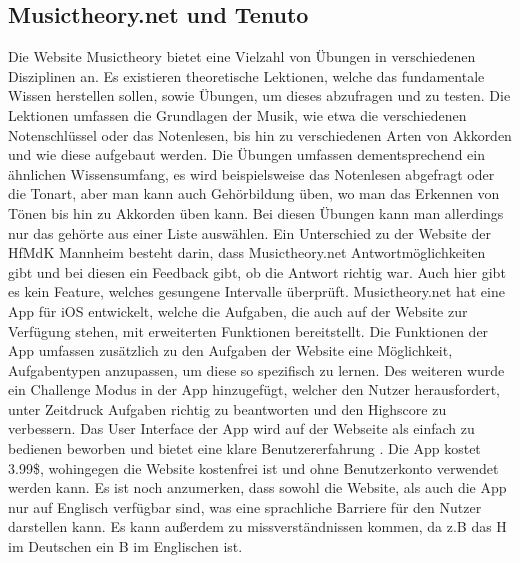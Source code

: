 \subsection*{Musictheory.net und Tenuto}
\label{sec:Musictheory.net} \label{sec:Tenuto}
Die Website Musictheory bietet eine Vielzahl von Übungen in verschiedenen Disziplinen an. Es existieren theoretische Lektionen, welche das fundamentale Wissen herstellen sollen, sowie Übungen, um dieses abzufragen und zu testen. 
Die Lektionen umfassen die Grundlagen der Musik, wie etwa die verschiedenen Notenschlüssel oder das Notenlesen, bis hin zu verschiedenen Arten von Akkorden und wie diese aufgebaut werden. Die Übungen umfassen dementsprechend ein ähnlichen Wissensumfang, es wird beispielsweise das Notenlesen abgefragt oder die Tonart, aber man kann auch Gehörbildung üben, wo man das Erkennen von Tönen bis hin zu Akkorden üben kann. Bei diesen Übungen kann man
allerdings nur das gehörte aus einer Liste auswählen. Ein Unterschied zu der Website der HfMdK Mannheim besteht darin, dass Musictheory.net Antwortmöglichkeiten gibt und bei diesen ein Feedback gibt, ob 
die Antwort richtig war. Auch hier gibt es kein Feature, welches gesungene Intervalle überprüft. Musictheory.net hat eine App für iOS entwickelt, welche die Aufgaben, die auch auf der Website zur Verfügung stehen,
mit erweiterten Funktionen bereitstellt. Die Funktionen der App umfassen zusätzlich zu den Aufgaben der Website eine Möglichkeit, Aufgabentypen anzupassen, um diese so spezifisch zu lernen. Des weiteren wurde ein Challenge Modus in der App hinzugefügt, welcher den Nutzer herausfordert, unter Zeitdruck Aufgaben richtig zu beantworten und den Highscore zu verbessern. Das User Interface der App wird auf der Webseite als einfach zu bedienen beworben und bietet eine klare Benutzererfahrung . 
Die App kostet 3.99\$, wohingegen die Website kostenfrei ist und ohne Benutzerkonto verwendet werden kann. Es ist noch anzumerken, dass sowohl die Website, als auch die App nur auf Englisch verfügbar sind, was eine sprachliche Barriere für den Nutzer darstellen kann. Es kann außerdem zu missverständnissen kommen, da z.B das H im Deutschen ein B im Englischen ist. \cite{musictheory}

